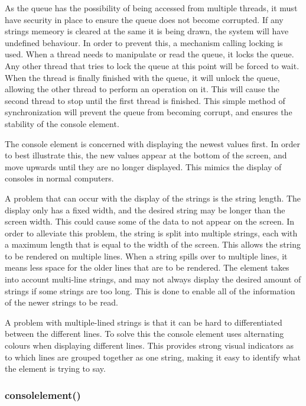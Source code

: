 As the queue has the possibility of being accessed from multiple threads, it must have security in place to ensure the queue does not become corrupted. If any strings memeory is cleared at the same it is being drawn, the system will have undefined behaviour. In order to prevent this, a mechanism calling locking is used. When a thread needs to manipulate or read the queue, it locks the queue. Any other thread that tries to lock the queue at this point will be forced to wait. When the thread is finally finished with the queue, it will unlock the queue, allowing the other thread to perform an operation on it. This will cause the second thread to stop until the first thread is finished. This simple method of synchronization will prevent the queue from becoming corrupt, and ensures the stability of the console element.

The console element is concerned with displaying the newest values first. In order to best illustrate this, the new values appear at the bottom of the screen, and move upwards until they are no longer displayed. This mimics the display of consoles in normal computers. 

A problem that can occur with the display of the strings is the string length. The display only has a fixed width, and the desired string may be longer than the screen width. This could cause some of the data to not appear on the screen. In order to alleviate this problem, the string is split into multiple strings, each with a maximum length that is equal to the width of the screen. This allows the string to be rendered on multiple lines. When a string spills over to multiple lines, it means less space for the older lines that are to be rendered. The element takes into account multi-line strings, and may not always display the desired amount of strings if some strings are too long. This is done to enable all of the information of the newer strings to be read.

A problem with multiple-lined strings is that it can be hard to differentiated between the different lines. To solve this the console element uses alternating colours when displaying different lines. This provides strong visual indicators as to which lines are grouped together as one string, making it easy to identify what the element is trying to say.

\subsubsection{consolelement()}

